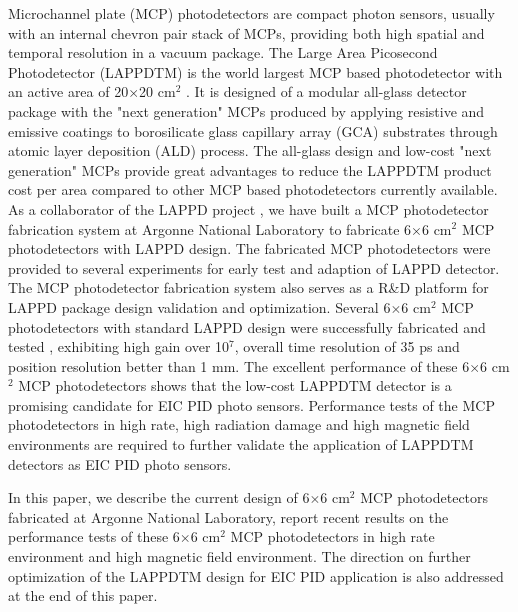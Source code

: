 \documentclass[preprint,5p]{elsarticle}
\begin{document}
Microchannel plate (MCP) photodetectors are compact photon sensors, usually with an internal chevron pair stack of MCPs, providing both high spatial and temporal resolution in a vacuum package. The Large Area Picosecond Photodetector (LAPPDTM) is the world largest MCP based photodetector with an active area of 20$\times$20 cm$^2$ \cite{LAPPD}. It is designed of a modular all-glass detector package with the "next generation" MCPs produced by applying resistive and emissive coatings to borosilicate glass capillary array (GCA) substrates through atomic layer deposition (ALD) process. The all-glass design and low-cost "next generation" MCPs provide great advantages to reduce the LAPPDTM product cost per area compared to other MCP based photodetectors currently available. As a collaborator of the LAPPD project \cite{LAPPD2}, we have built a MCP photodetector fabrication system \cite{LAPPD-ANL} at Argonne National Laboratory to fabricate 6$\times$6 cm$^2$ MCP photodetectors with LAPPD design. The fabricated MCP photodetectors were provided to several experiments for early test and adaption of LAPPD detector. The MCP photodetector fabrication system also serves as a R{\&}D platform for LAPPD package design validation and optimization. Several 6$\times$6 cm$^2$ MCP photodetectors with standard LAPPD design were successfully fabricated and tested \cite{ANL-MCPs,Wang-MCPs,Wang-MCPs}, exhibiting high gain over 10$^7$, overall time resolution of 35 ps and position resolution better than 1 mm. The excellent performance of these 6$\times$6 cm$^2$ MCP photodetectors shows that the low-cost LAPPDTM detector is a promising candidate for EIC PID photo sensors. Performance tests of the MCP photodetectors in high rate, high radiation damage and high magnetic field environments are required to further validate the application of LAPPDTM detectors as EIC PID photo sensors. 

In this paper, we describe the current design of 6$\times$6 cm$^2$ MCP photodetectors fabricated at Argonne National Laboratory, report recent results on the performance tests of these 6$\times$6 cm$^2$ MCP photodetectors in high rate environment and high magnetic field environment. The direction on further optimization of the LAPPDTM design for EIC PID application is also addressed at the end of this paper.
\end{document}
